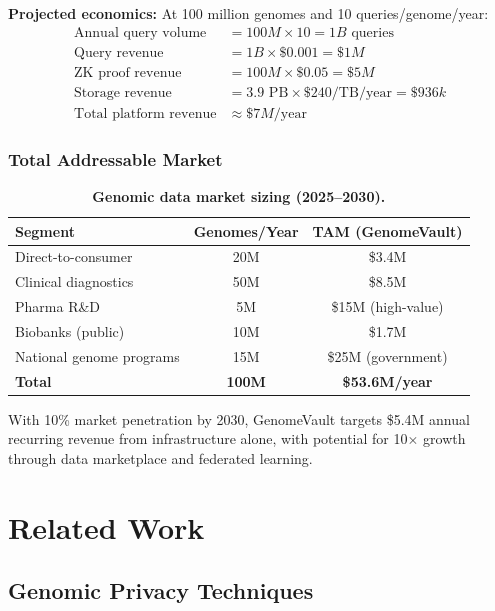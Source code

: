 \documentclass[12pt,a4paper]{article}
\begin{document}
\textbf{Projected economics:} At 100 million genomes and 10 queries/genome/year:
\begin{align*}
\text{Annual query volume} &= 100M \times 10 = 1B \text{ queries} \\
\text{Query revenue} &= 1B \times \$0.001 = \$1M \\
\text{ZK proof revenue} &= 100M \times \$0.05 = \$5M \\
\text{Storage revenue} &= 3.9 \text{ PB} \times \$240/\text{TB}/\text{year} = \$936k \\
\text{Total platform revenue} &\approx \$7M/\text{year}
\end{align*}

\subsubsection{Total Addressable Market}

\begin{table}[h]
\centering
\caption{\textbf{Genomic data market sizing (2025--2030).}}
\begin{tabular}{lcc}
\toprule
\textbf{Segment} & \textbf{Genomes/Year} & \textbf{TAM (GenomeVault)} \\
\midrule
Direct-to-consumer & 20M & \$3.4M \\
Clinical diagnostics & 50M & \$8.5M \\
Pharma R\&D & 5M & \$15M (high-value) \\
Biobanks (public) & 10M & \$1.7M \\
National genome programs & 15M & \$25M (government) \\
\midrule
\textbf{Total} & \textbf{100M} & \textbf{\$53.6M/year} \\
\bottomrule
\end{tabular}
\end{table}

With 10\% market penetration by 2030, GenomeVault targets \$5.4M annual recurring revenue from infrastructure alone, with potential for 10$\times$ growth through data marketplace and federated learning.

\section{Related Work}

\subsection{Genomic Privacy Techniques}
\end{document}
